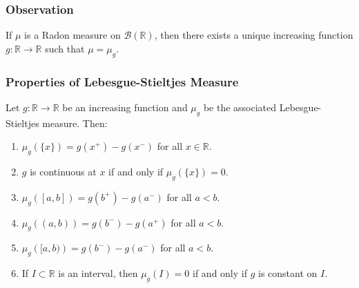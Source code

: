 \documentclass[11pt]{article}
\begin{document}
\begin{center}
\end{center}

\subsubsection*{Observation}
If \(\mu\) is a Radon measure on \(\mathcal{B}(\mathbb{R})\), then there exists a unique increasing function \(g: \mathbb{R} \to \mathbb{R}\) such that \(\mu = \mu_g\).

\subsubsection{Properties of Lebesgue-Stieltjes Measure}
Let \(g: \mathbb{R} \to \mathbb{R}\) be an increasing function and \(\mu_g\) be the associated Lebesgue-Stieltjes measure. Then:
\begin{enumerate}[label=\alph*)]
    \item \(\mu_g\left(\{x\}\right) = g(x^+) - g(x^-)\) for all \(x \in \mathbb{R}\).
    \item \(g\) is continuous at \(x\) if and only if \(\mu_g(\{x\}) = 0\).
    \item \(\mu_g \left([a, b]\right) = g(b^+) - g(a^-)\) for all \(a < b\).
    \item \(\mu_g \left((a, b)\right) = g(b^-) - g(a^+)\) for all \(a < b\).
    \item \(\mu_g \left([a, b)\right) = g(b^-) - g(a^-)\) for all \(a < b\).
    \item If \(I \subset \mathbb{R}\) is an interval, then \(\mu_g(I) = 0\) if and only if \(g\) is constant on \(I\).
\end{enumerate}
\end{document}
